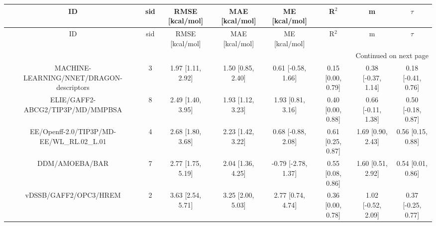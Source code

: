\documentclass[8pt]{article}
\begin{document}
\begin{center}
\begin{footnotesize}
\begin{longtable}{|cccccccc|}
\toprule
                                       ID & sid &   RMSE [kcal/mol] &    MAE [kcal/mol] &       ME [kcal/mol] &             R$^2$ &                  m &             $\tau$ \\
\midrule
\endfirsthead

\toprule
                                       ID & sid &   RMSE [kcal/mol] &    MAE [kcal/mol] &       ME [kcal/mol] &             R$^2$ &                  m &             $\tau$ \\
\midrule
\endhead
\midrule
\multicolumn{8}{r}{{Continued on next page}} \\
\midrule
\endfoot

\bottomrule
\endlastfoot
 MACHINE-LEARNING/NNET/DRAGON-descriptors &   3 & 1.97 [1.11, 2.92] & 1.50 [0.85, 2.40] &  0.61 [-0.58, 1.66] & 0.15 [0.00, 0.79] & 0.38 [-0.37, 1.14] & 0.18 [-0.41, 0.76] \\
         ELIE/GAFF2-ABCG2/TIP3P/MD/MMPBSA &   8 & 2.49 [1.40, 3.95] & 1.93 [1.12, 3.23] &   1.93 [0.81, 3.16] & 0.40 [0.00, 0.88] & 0.66 [-0.11, 1.38] & 0.50 [-0.18, 0.87] \\
EE/Openff-2.0/TIP3P/MD-EE/WL\_RL.02\_L.01 &   4 & 2.68 [1.80, 3.68] & 2.23 [1.42, 3.22] &  0.68 [-0.88, 2.08] & 0.61 [0.25, 0.87] &  1.69 [0.90, 2.43] &  0.56 [0.15, 0.88] \\
                           DDM/AMOEBA/BAR &   7 & 2.77 [1.75, 5.19] & 2.04 [1.36, 4.25] & -0.79 [-2.78, 1.37] & 0.55 [0.08, 0.86] &  1.60 [0.51, 2.92] &  0.54 [0.01, 0.86] \\
                    vDSSB/GAFF2/OPC3/HREM &   2 & 3.63 [2.54, 5.71] & 3.25 [2.00, 5.03] &   2.77 [0.74, 4.74] & 0.36 [0.00, 0.78] & 1.02 [-0.52, 2.09] & 0.37 [-0.25, 0.77] \\
\end{longtable}
\end{footnotesize}
\end{center}
\end{document}
